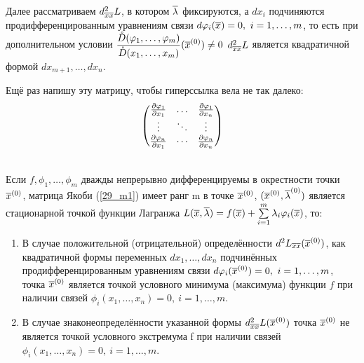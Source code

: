 \begin{note}
	Далее рассматриваем $d^2_{\overline x\overline x}L$, в котором $\overline{\lambda}$ фиксируются, а $dx_i$ подчиняются продифференцированным уравнениям связи $d\varphi_i(\overline x)=0,\ i=1,\dots,m$, то есть при дополнительном условии $\displaystyle\frac{\mathring D(\varphi_1,\dots,\varphi_m)}{\mathring D(x_1,\dots,x_m)}(\overline x^{({0})})\ne0$ $d^2_{\overline x\overline x}L$ является квадратичной формой $dx_{m+1},\dots,dx_{n}$.
\end{note}
\begin{anote}
	Ещё раз напишу эту матрицу, чтобы гиперссылка вела не так далеко:
	\begin{equation}\label{29_m1}
		\begin{pmatrix}
			\frac{\partial \varphi_1}{\partial x_1} & \dots & \frac{\partial \varphi_1}{\partial x_n} \\
			\vdots & \ddots & \vdots \\
			\frac{\partial \varphi_n}{\partial x_1} & \cdots & \frac{\partial \varphi_n}{\partial x_n}
		\end{pmatrix}
	\end{equation}
\end{anote}
\begin{theorem}\label{29_th4}\\
	Если $f,\phi_1,\dots,\phi_m$ дважды непрерывно дифференцируемы в окрестности точки $\overline x^{({0})}$, матрица Якоби (\ref{29_m1}) имеет ранг m в точке $\overline x^{({0})}$, $(\overline x^{({0})},\overline{\lambda}^{({0})})$ является стационарной точкой функции Лагранжа $L(\vx,\v\la)=f(\vx)+\sum_{i=1}^m\la_i\phi_i(\vx)$, то:
	\begin{enumerate}
		\item В случае положительной (отрицательной) определённости $d^2L_{\overline x\overline x}(\overline x^{({0})})$, как квадратичной формы переменных $dx_1,\dots,dx_n$ подчинённых продифференцированным уравнениям связи $d\varphi_i(\overline x^{({0})})=0,\ i=1,\dots,m$, точка $\overline x^{({0})}$ является точкой условного минимума (максимума) функции $f$ при наличии связей $\phi_i(x_1,\dots,x_n)=0,\ i=1,\dots,m$.
		\item В случае знаконеопределённости указанной формы $d^2_{\overline x\overline x}L(\overline x^{({0})})$ точка $\overline x^{({0})}$ не является точкой условного экстремума f при наличии связей $\phi_i(x_1,\dots,x_n)=0,\ i=1,\dots,m$.
	\end{enumerate}
\end{theorem}
